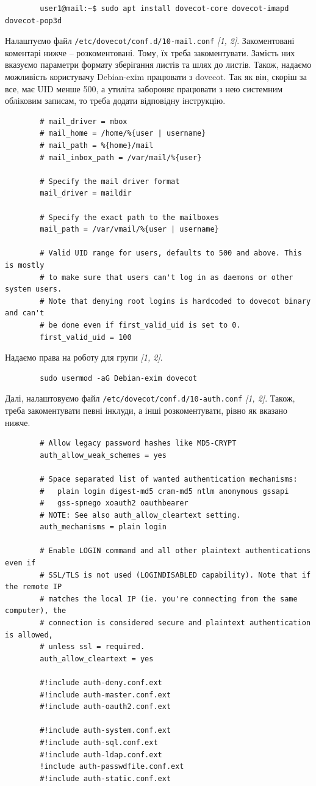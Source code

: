 \documentclass[14pt, a4paper]{extreport}
\begin{document}
	\begin{verbatim}
		user1@mail:~$ sudo apt install dovecot-core dovecot-imapd dovecot-pop3d
	\end{verbatim}
	
	Налаштуємо файл \texttt{/etc/dovecot/conf.d/10-mail.conf}  \textit{[1, 2]}. Закоментовані коментарі нижче -- розкоментовані. Тому, їх треба закоментувати. Замість них вказуємо параметри формату зберігання листів та шлях до листів. Також, надаємо можливість користувачу Debian-exim працювати з dovecot. Так як він, скоріш за все, має UID менше 500, а утиліта забороняє працювати з нею системним обліковим записам, то треба додати відповідну інструкцію.
	
	\begin{verbatim}
		# mail_driver = mbox
		# mail_home = /home/%{user | username}
		# mail_path = %{home}/mail
		# mail_inbox_path = /var/mail/%{user}
		
		# Specify the mail driver format
		mail_driver = maildir
		
		# Specify the exact path to the mailboxes
		mail_path = /var/vmail/%{user | username}
		
		# Valid UID range for users, defaults to 500 and above. This is mostly
		# to make sure that users can't log in as daemons or other system users.
		# Note that denying root logins is hardcoded to dovecot binary and can't
		# be done even if first_valid_uid is set to 0.
		first_valid_uid = 100
	\end{verbatim}
	
	Надаємо права на роботу для групи \textit{[1, 2]}.
	
	\begin{verbatim}
		sudo usermod -aG Debian-exim dovecot
	\end{verbatim}
	
	Далі, налаштовуємо файл \texttt{/etc/dovecot/conf.d/10-auth.conf} \textit{[1, 2]}. Також, треба закоментувати певні інклуди, а інші розкоментувати, рівно як вказано нижче.
	
	\begin{verbatim}
		# Allow legacy password hashes like MD5-CRYPT
		auth_allow_weak_schemes = yes
		
		# Space separated list of wanted authentication mechanisms:
		#   plain login digest-md5 cram-md5 ntlm anonymous gssapi
		#   gss-spnego xoauth2 oauthbearer
		# NOTE: See also auth_allow_cleartext setting.
		auth_mechanisms = plain login 
		
		# Enable LOGIN command and all other plaintext authentications even if
		# SSL/TLS is not used (LOGINDISABLED capability). Note that if the remote IP
		# matches the local IP (ie. you're connecting from the same computer), the
		# connection is considered secure and plaintext authentication is allowed,
		# unless ssl = required.
		auth_allow_cleartext = yes
		
		#!include auth-deny.conf.ext
		#!include auth-master.conf.ext
		#!include auth-oauth2.conf.ext
		
		#!include auth-system.conf.ext
		#!include auth-sql.conf.ext
		#!include auth-ldap.conf.ext
		!include auth-passwdfile.conf.ext
		#!include auth-static.conf.ext
	\end{verbatim}
	
\end{document}
